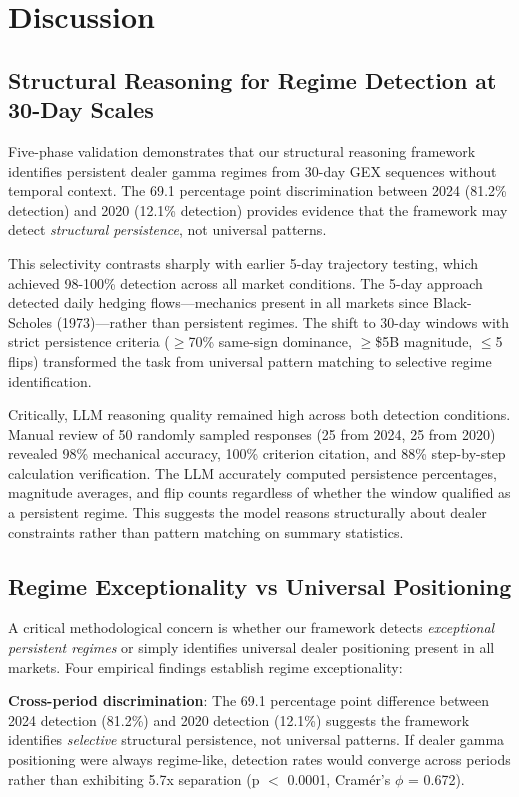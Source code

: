 \section{Discussion}

\subsection{Structural Reasoning for Regime Detection at 30-Day Scales}

Five-phase validation demonstrates that our structural reasoning framework identifies persistent dealer gamma regimes from 30-day GEX sequences without temporal context. The 69.1 percentage point discrimination between 2024 (81.2\% detection) and 2020 (12.1\% detection) provides evidence that the framework may detect \textit{structural persistence}, not universal patterns.

This selectivity contrasts sharply with earlier 5-day trajectory testing, which achieved 98-100\% detection across all market conditions. The 5-day approach detected daily hedging flows—mechanics present in all markets since Black-Scholes (1973)—rather than persistent regimes. The shift to 30-day windows with strict persistence criteria ($\geq$70\% same-sign dominance, $\geq$\$5B magnitude, $\leq$5 flips) transformed the task from universal pattern matching to selective regime identification.

Critically, LLM reasoning quality remained high across both detection conditions. Manual review of 50 randomly sampled responses (25 from 2024, 25 from 2020) revealed 98\% mechanical accuracy, 100\% criterion citation, and 88\% step-by-step calculation verification. The LLM accurately computed persistence percentages, magnitude averages, and flip counts regardless of whether the window qualified as a persistent regime. This suggests the model reasons structurally about dealer constraints rather than pattern matching on summary statistics.

\subsection{Regime Exceptionality vs Universal Positioning}

A critical methodological concern is whether our framework detects \textit{exceptional persistent regimes} or simply identifies universal dealer positioning present in all markets. Four empirical findings establish regime exceptionality:

\textbf{Cross-period discrimination}: The 69.1 percentage point difference between 2024 detection (81.2\%) and 2020 detection (12.1\%) suggests the framework identifies \textit{selective} structural persistence, not universal patterns. If dealer gamma positioning were always regime-like, detection rates would converge across periods rather than exhibiting 5.7x separation (p $<$ 0.0001, Cram\'er's $\phi$ = 0.672).

